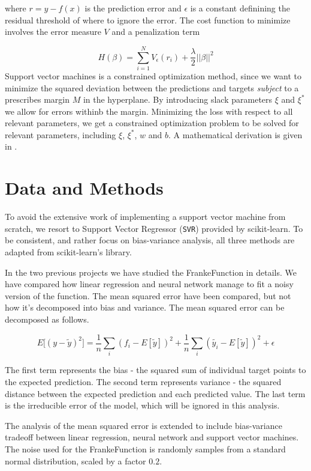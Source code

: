 \documentclass[a4paper]{article}
\def\code#1{\texttt{#1}}
\begin{document}
	where $r = y - f(x)$ is the prediction error and $\epsilon$ is a constant definining the residual threshold of where to ignore the error. The cost function to minimize involves the error measure $V$ and a penalization term
	
	\[ H(\beta) = \sum_{i=1}^N V_{\epsilon}(r_i) + \frac{\lambda}{2} ||\beta||^2 \]
	Support vector machines is a constrained optimization method, since we want to minimize the squared deviation between the predictions and targets \textit{subject} to a prescribes margin $M$ in the hyperplane. By introducing slack parameters $\xi$ and $\xi^*$ we allow for errors withinb the margin. Minimizing the loss with respect to all relevant parameters, we get a constrained optimization problem to be solved for relevant parameters, including $\xi$, $\xi^*$, $w$ and $b$. A mathematical derivation is given in \cite{Hastie2009}.
	
	
	
	\section{Data and Methods}
	To avoid the extensive work of implementing a support vector machine from scratch, we resort to Support Vector Regressor (\code{SVR}) provided by scikit-learn. To be consistent, and rather focus on bias-variance analysis, all three methods are adapted from scikit-learn's library.
	
	In the two previous projects we have studied the FrankeFunction in details. We have compared how linear regression and neural network manage to fit a noisy version of the function. The mean squared error have been compared, but not how it's decomposed into bias and variance. The mean squared error can be decomposed as follows.
	
	\[ E\big[(y - \tilde{y})^2\big] = \frac{1}{n}\sum_i (f_i - E[\tilde{y}])^2 + \frac{1}{n}\sum_i (\tilde{y_i} - E[\tilde{y}])^2 + \epsilon \]
	
	The first term represents the bias - the squared sum of individual target points to the expected prediction. The second term represents variance - the squared distance between the expected prediction and each predicted value. The last term is the irreducible error of the model, which will be ignored in this analysis.
	
	The analysis of the mean squared error is extended to include bias-variance tradeoff between linear regression, neural network and support vector machines. The noise used for the FrankeFunction is randomly samples from a standard normal distribution, scaled by a factor $0.2$. \\
	
\end{document}
